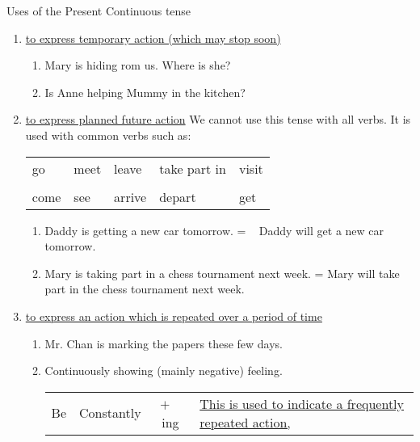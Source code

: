 Uses of the Present Continuous tense
\begin{enumerate}
    \item \underline{to express temporary action (which may stop soon)}
        \begin{enumerate}
            \item Mary is hiding rom us. Where is she?
            \item Is Anne helping Mummy in the kitchen?
        \end{enumerate}
    \item \underline{to express planned future action}
        \newline
        We cannot use this tense with all verbs.
        It is used with common verbs such as:
        \begin{center}
        \begin{tabular}{lllll}
            go & meet & leave & take part in & visit \\
            & & & & \\
            come & see & arrive & depart & get
        \end{tabular}
        \end{center}
        \begin{enumerate}
            \item Daddy is getting a new car tomorrow.
                \newline
                = ~ Daddy will get a new car tomorrow.
            \item Mary is taking part in a chess tournament next week.
                \newline
                = Mary will take part in the chess tournament next week.
        \end{enumerate}
    \item \underline{to express an action which is repeated over a period of time}
        \begin{enumerate}
            \item Mr. Chan is marking the papers these few days.
                \newline
            \item Continuously showing (mainly negative) feeling.
                \newline
                \begin{tabular}{cccl}
                    \multirow{3}{*}{Be}
                    & Constantly
                    & \multirow{3}{*}{$+$ ~ ing}
                    & \underline{This is used to indicate a frequently repeated action,}\\

\end{tabular}
\end{enumerate}
\end{enumerate}
